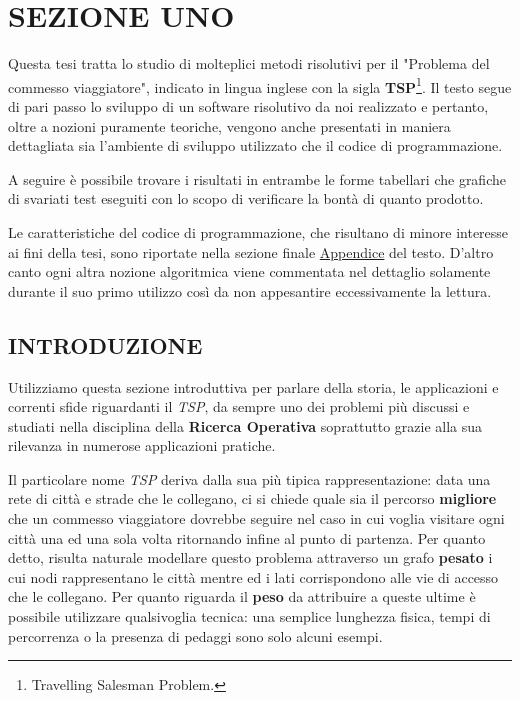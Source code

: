 \documentclass[11pt]{article}
\begin{document}
\section*{SEZIONE UNO}
\label{sec:SezioneUnoS}

Questa tesi tratta lo studio di molteplici metodi risolutivi per il "Problema del commesso viaggiatore", indicato in lingua inglese con la sigla \textbf{TSP}\footnote{Travelling Salesman Problem.}. Il testo segue di pari passo lo sviluppo di un software risolutivo da noi realizzato e pertanto, oltre a nozioni puramente teoriche, vengono anche presentati in maniera dettagliata sia l'ambiente di sviluppo utilizzato che il codice di programmazione.

A seguire è possibile trovare i risultati in entrambe le forme tabellari che grafiche di svariati test eseguiti con lo scopo di verificare la bontà di quanto prodotto.

Le caratteristiche del codice di programmazione, che risultano di minore interesse ai fini della tesi, sono riportate nella sezione finale \hyperref[sec:AppendiceS]{Appendice} del testo. D'altro canto ogni altra nozione algoritmica viene commentata nel dettaglio solamente durante il suo primo utilizzo così da non appesantire eccessivamente la lettura.

\subsection*{INTRODUZIONE}
\label{sec:IntroduzionS}

Utilizziamo questa sezione introduttiva per parlare della storia, le applicazioni e correnti sfide riguardanti il \textit{TSP}, da sempre uno dei problemi più discussi e studiati nella disciplina della \textbf{Ricerca Operativa} soprattutto grazie alla sua rilevanza in numerose applicazioni pratiche.

Il particolare nome \textit{TSP} deriva dalla sua più tipica rappresentazione: data una rete di città e strade che le collegano, ci si chiede quale sia il percorso \textbf{migliore} che un commesso viaggiatore dovrebbe seguire nel caso in cui voglia visitare ogni città una ed una sola volta ritornando infine al punto di partenza. Per quanto detto, risulta naturale modellare questo problema attraverso un grafo \textbf{pesato} i cui nodi rappresentano le città mentre ed i lati corrispondono alle vie di accesso che le collegano. Per quanto riguarda il \textbf{peso} da attribuire a queste ultime è possibile utilizzare qualsivoglia tecnica: una semplice lunghezza fisica, tempi di percorrenza o la presenza di pedaggi sono solo alcuni esempi.
\end{document}

